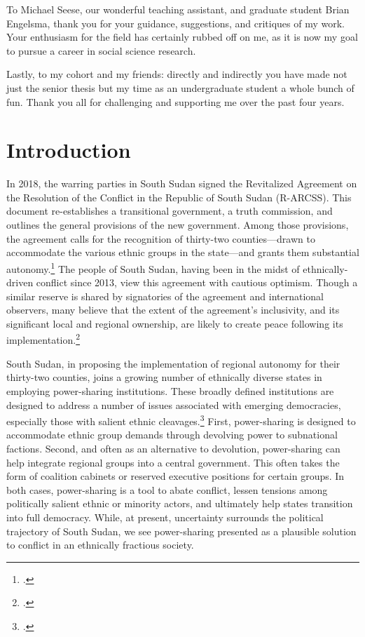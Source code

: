 \documentclass[12pt]{article}
\begin{document}
To Michael Seese, our wonderful teaching assistant, and graduate student Brian Engelsma, thank you for your guidance, suggestions, and critiques of my work. Your enthusiasm for the field has certainly rubbed off on me, as it is now my goal to pursue a career in social science research. 

Lastly, to my cohort and my friends: directly and indirectly you have made not just the senior thesis but my time as an undergraduate student a whole bunch of fun. Thank you all for challenging and supporting me over the past four years.

\pagebreak


\doublespacing

\section{Introduction}
In 2018, the warring parties in South Sudan signed the Revitalized Agreement on the Resolution of the Conflict in the Republic of South Sudan (R-ARCSS). This document re-establishes a transitional government, a truth commission, and outlines the general provisions of the new government. Among those provisions, the agreement calls for the recognition of thirty-two counties---drawn to accommodate the various ethnic groups in the state---and grants them substantial autonomy.\footcite{intergovernmental_authority_on_development_agreement_2015, vhumbunu_reviving_2019} The people of South Sudan, having been in the midst of ethnically-driven conflict since 2013, view this agreement with cautious optimism. Though a similar reserve is shared by signatories of the agreement and international observers, many believe that the extent of the agreement's inclusivity, and its significant local and regional ownership, are likely to create peace following its implementation.\footcite{vhumbunu_reviving_2019, njoroge_status_2019} 

South Sudan, in proposing the implementation of regional autonomy for their thirty-two counties, joins a growing number of ethnically diverse states in employing power-sharing institutions. These broadly defined institutions are designed to address a number of issues associated with emerging democracies, especially those with salient ethnic cleavages.\footcite{horowitz_ethnic_1985, lijphart_consociational_1969, esman_management_1973, nordlinger_conflict_1972} First, power-sharing is designed to accommodate ethnic group demands through devolving power to subnational factions. Second, and often as an alternative to devolution, power-sharing can help integrate regional groups into a central government. This often takes the form of coalition cabinets or reserved executive positions for certain groups. In both cases, power-sharing is a tool to abate conflict, lessen tensions among politically salient ethnic or minority actors, and ultimately help states transition into full democracy. While, at present, uncertainty surrounds the political trajectory of South Sudan, we see power-sharing presented as a plausible solution to conflict in an ethnically fractious society. 
\end{document}
